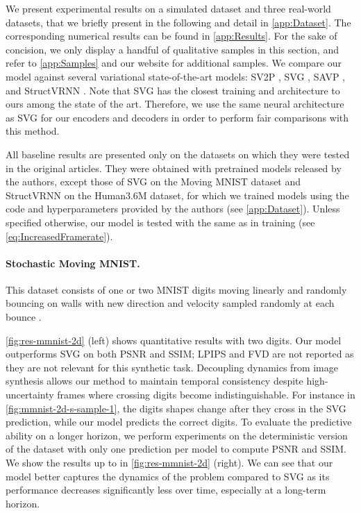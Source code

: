 \documentclass{article}
\begin{document}
We present experimental results on a simulated dataset and three real-world datasets, that we briefly present in the following and detail in \cref{app:Dataset}.
The corresponding numerical results can be found in \cref{app:Results}.
For the sake of concision, we only display a handful of qualitative samples in this section, and refer to \cref{app:Samples} and our website for additional samples.
We compare our model against several variational state-of-the-art models: SV2P \citep{Babaeizadeh2018}, SVG \citep{Denton2018}, SAVP \citep{Lee2018}, and StructVRNN \citep{Minderer2019}.
Note that SVG has the closest training and architecture to ours among the state of the art.
Therefore, we use the same neural architecture as SVG for our encoders and decoders in order to perform fair comparisons with this method.

All baseline results are presented only on the datasets on which they were tested in the original articles.
They were obtained with pretrained models released by the authors, except those of SVG on the Moving MNIST dataset and StructVRNN on the Human3.6M dataset, for which we trained models using the code and hyperparameters provided by the authors (see \cref{app:Dataset}).
Unless specified otherwise, our model is tested with the same  as in training (see \cref{eq:IncreasedFramerate}).

\paragraph{Stochastic Moving MNIST.}

This dataset consists of one or two MNIST digits \citep{LeCun1998} moving linearly and randomly bouncing on walls with new direction and velocity sampled randomly at each bounce \citep{Denton2018}.

\cref{fig:res-mmnist-2d} (left) shows quantitative results with two digits.
Our model outperforms SVG on both PSNR and SSIM; LPIPS and FVD are not reported as they are not relevant for this synthetic task.
Decoupling dynamics from image synthesis allows our method to maintain temporal consistency despite high-uncertainty frames where crossing digits become indistinguishable.
For instance in \cref{fig:mmnist-2d-s-sample-1}, the digits shapes change after they cross in the SVG prediction, while our model predicts the correct digits.
To evaluate the predictive ability on a longer horizon, we perform experiments on the deterministic version of the dataset \citep{Srivastava2015} with only one prediction per model to compute PSNR and SSIM.
We show the results up to  in \cref{fig:res-mmnist-2d} (right).
We can see that our model better captures the dynamics of the problem compared to SVG as its performance decreases significantly less over time, especially at a long-term horizon.
\end{document}
